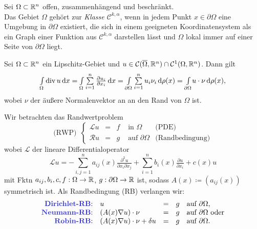 \documentclass{cheat-sheet}
\newcommand{\Cont}{\mathcal{C}} %
\newcommand{\clos}[1]{\overline{#1}} %
\newcommand{\cOmega}{\clos{\Omega}} %
\newcommand{\bOmega}{\partial \Omega} %
\newcommand{\LL}{\mathcal{L}} %
\newcommand{\RR}{\mathcal{R}} %
\DeclareMathOperator{\dive}{div} %
\begin{document}
\begin{defn}
  Sei $\Omega \subset \mathbb{R}^n$ offen, zusammenhängend und beschränkt. \\
  Das Gebiet $\Omega$ gehört zur \emph{Klasse $\Cont^{k,\alpha}$}, wenn in jedem Punkt $x \in \bOmega$ eine Umgebung in $\bOmega$ existiert, die sich in einem geeigneten Koordinatensystem als ein Graph einer Funktion aus $\Cont^{k,\alpha}$ darstellen lässt und $\Omega$ lokal immer auf einer Seite von $\bOmega$ liegt.
\end{defn}


\begin{satz}
  Sei $\Omega \subset \mathbb{R}^n$ ein Lipschitz-Gebiet und $u \in \Cont(\cOmega, \R^n) \cap \Cont^1(\Omega, \R^n)$.
  Dann gilt
  \[ \Int{\Omega}{}{\dive u}{x} = \Int{\Omega}{}{\sum_{i=1}^n \tfrac{\partial u_i}{\partial x_i}}{x} = \Int{\bOmega}{}{\sum_{i=1}^n u_i \nu_i}{\rho(x)} = \Int{\bOmega}{}{u \cdot \nu}{\rho(x)}, \]
  wobei $\nu$ der äußere Normalenvektor an an den Rand von $\Omega$ ist.
\end{satz}

\begin{prob}
  Wir betrachten das Randwertproblem
  \[
    \text{(RWP)} \enspace \left\{ \begin{array}{rllll}
      \LL u &=& f &\text{ in $\Omega$} & \text{(PDE)} \\
      \RR u &=& g &\text{ auf $\bOmega$} & \text{(Randbedingung)}
    \end{array} \right.
  \]
  wobei $\LL$ der lineare Differentialoperator
  \[
    \LL u = - \sum_{i,j=1}^n a_{ij}(x) \tfrac{\partial^2 u}{\partial x_i \partial x_j} + \sum_{i=1}^n b_i(x) \tfrac{\partial u}{\partial x_i} + c(x) u
  \]
  mit Fktn $a_{ij}, b_i, c, f : \Omega \to \mathbb{R}$, $g : \bOmega \to \R$ ist, sodass $A(x) \coloneqq (a_{ij}(x))$ symmetrisch ist.
  Als Randbedingung (RB) verlangen wir:
  \[ \begin{array}{rllll}
    \text{\emph{Dirichlet-RB}:} & u &=& g & \text{auf $\bOmega$,} \\
    \text{\emph{Neumann-RB}:} & (A(x) \nabla u) \cdot \nu &=& g & \text{auf $\bOmega$ oder} \\
    \text{\emph{Robin-RB}:} & (A(x) \nabla u) \cdot \nu + \delta u &=& g & \text{auf $\bOmega$.}
  \end{array} \]
\end{prob}
\end{document}
